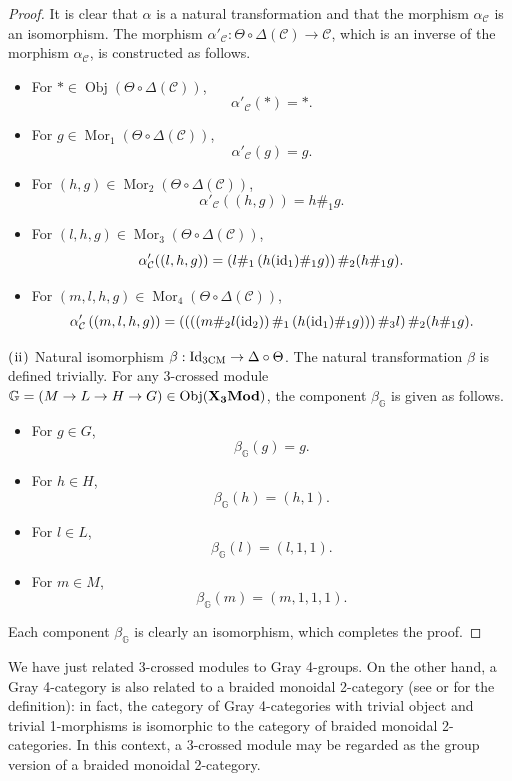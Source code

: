 \documentclass[11pt, reqno]{amsart} %
\newcommand{\obj}{{\mathop{\mathrm{Obj}}}}
\newcommand{\mor}{{\mathop{\mathrm{Mor}}}}
\newcommand{\TXMod}{{\bf X_3Mod}}
\newcommand{\bG}{{\mathbb{G}}}
\newcommand{\cC}{{\mathcal{C}}}
\theoremstyle{definition}
\theoremstyle{remark}
\numberwithin{equation}{section}
\begin{document}
\begin{proof}
It is clear that $\alpha$ is a natural transformation and that the morphism $\alpha_\cC$ is an isomorphism. The morphism $\alpha'_\cC : \Theta\circ \Delta(\cC) \rightarrow \cC$, which is an inverse of the morphism $\alpha_\cC$, is constructed as follows.
\begin{itemize}
  \item For $* \in \obj\left(\Theta\circ \Delta(\cC)\right)$, 
  \[
  \alpha'_\cC (*) = *.
  \]
  \item For $g \in \mor_1\left(\Theta\circ \Delta(\cC)\right)$, 
  \[
  \alpha'_\cC (g) = g.
  \]
  \item For $(h,g) \in \mor_2\left(\Theta\circ \Delta(\cC)\right)$, 
  \[
  \alpha'_\cC ((h,g)) = h \#_1 g .
  \]
  \item For $(l,h,g) \in \mor_3\left(\Theta\circ \Delta(\cC)\right)$, 
  \[
  \alpha'_\cC ((l,h,g)) = \left(l \#_1 \left(h({\rm id_1}) \#_1 g\right)  \right) \#_2 (h \#_1 g) .
  \]
  \item For $(m,l,h,g) \in \mor_4\left(\Theta\circ \Delta(\cC)\right)$, 
  \[
  \alpha'_\cC \left( (m,l,h,g) \right) = \left(\left(\left(\left( m \#_2 l({\rm id_2}) \right) \#_1 \left(h({\rm id_1}) \#_1 g\right) \right) \right)  \#_3 l \right)  \#_2 (h \#_1 g).
  \]
\end{itemize}


\vspace{.5em}
\noindent
$\rm(\hspace{.08em}ii\hspace{.08em})$ Natural isomorphism $\beta : {\rm Id}_{\text{3CM}} \rightarrow \Delta \circ \Theta$. The natural transformation $\beta$ is defined trivially. For any 3-crossed module $\bG=(M\rightarrow L\rightarrow H\rightarrow G) \in \obj(\TXMod)$, the component $\beta_\bG$ is given as follows.
\begin{itemize}
  \item For $g \in G$, 
  \[
  \beta_\bG (g) = g.
  \]
  \item For $h \in H$, 
  \[
  \beta_\bG (h) = (h,1).
  \]
  \item For $l \in L$, 
  \[
  \beta_\bG (l) = (l,1,1).
  \]
  \item For $m \in M$, 
  \[
  \beta_\bG (m) = (m,1,1,1).
  \]
\end{itemize}


Each component $\beta_\bG$ is clearly an isomorphism, which completes the proof.
\end{proof}

We have just related 3-crossed modules to Gray 4-groups. On the other hand, a Gray 4-category is also related to a braided monoidal 2-category (see \cite{Baez:1996} or \cite{Crans:1998} for the definition): in fact, the category of Gray 4-categories with trivial object and trivial 1-morphisms is isomorphic to the category of braided monoidal 2-categories. In this context, a 3-crossed module may be regarded as the group version of a braided monoidal 2-category.
\end{document}
